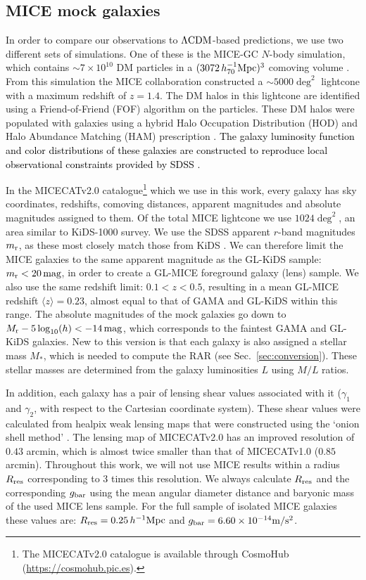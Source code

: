 \documentclass[usenatbib]{mnras}
\newcommand{\hMpc}{\, h^{-1}{\rm{Mpc}} }
\newcommand{\magn}{\, {\rm mag} }
\newcommand{\mpss}{ {\rm m/s^2} }
\newcommand{\hsMpc}{\, h_{70}^{-1}{\rm{Mpc}} }
\newcommand{\lcdm}{{\rm \Lambda CDM}}
\newcommand*{\meanb}[1]{\langle{#1}\rangle}
\newcommand*{\E}[1]{\times 10^{#1}}
\newcommand{\un}[1]{_{\rm #1}}
\begin{document}
\subsection{MICE mock galaxies}
\label{sec:mice_mocks}

In order to compare our observations to $\lcdm$-based predictions, we use two different sets of simulations. One of these is the MICE-GC $N$-body simulation, which contains $\sim 7\E{10}$ DM particles in a $(3072 \hsMpc)^3$ comoving volume \cite[]{fosalba2015b}. From this simulation the MICE collaboration constructed a $\sim5000\deg^2$ lightcone with a maximum redshift of $z=1.4$. The DM halos in this lightcone are identified using a Friend-of-Friend (FOF) algorithm on the particles. These DM halos were populated with galaxies using a hybrid Halo Occupation Distribution (HOD) and Halo Abundance Matching (HAM) prescription \cite[]{carretero2015,crocce2015}. \textcolor{black}{The galaxy luminosity function and color distributions of these galaxies are constructed to reproduce local observational constraints provided by SDSS \cite[]{blanton2003a, blanton2003b, blanton2005}.}

In the MICECATv2.0 catalogue\footnote{The MICECATv2.0 catalogue is available through CosmoHub (\url{https://cosmohub.pic.es}).} which we use in this work, every galaxy has sky coordinates, redshifts, comoving distances, apparent magnitudes and absolute magnitudes assigned to them. Of the total MICE lightcone we use $1024\deg^2$, an area similar to KiDS-1000 survey. We use the SDSS apparent $r$-band magnitudes $m\un{r}$, as these most closely match those from KiDS \cite[see][]{brouwer2018}. We can therefore limit the MICE galaxies to the same apparent magnitude as the GL-KiDS sample: $m\un{r}<20 \, {\rm mag}$, in order to create a GL-MICE foreground galaxy (lens) sample. We also use the same redshift limit: $0.1<z<0.5$, resulting in a mean GL-MICE redshift $\meanb{z}=0.23$, almost equal to that of GAMA and GL-KiDS within this range. The absolute magnitudes of the mock galaxies go down to $M\un{r} - 5\log_{10}(h) < -14 \magn$, which corresponds to the faintest GAMA and GL-KiDS galaxies. New to this version is that each galaxy is also assigned a stellar mass $M_*$, which is needed to compute the RAR (see Sec.~\ref{sec:conversion}). These stellar masses are determined from the galaxy luminosities $L$ using \cite{bell2001} $M/L$ ratios.

In addition, each galaxy has a pair of lensing shear values associated with it ($\gamma_1$ and $\gamma_2$, with respect to the Cartesian coordinate system). These shear values were calculated from healpix weak lensing maps that were constructed using the `onion shell method' \cite[]{fosalba2008, fosalba2015a}. The lensing map of MICECATv2.0 has an improved resolution of $0.43$ arcmin, which is almost twice smaller than that of MICECATv1.0 ($0.85$ arcmin). Throughout this work, we will not use MICE results within a radius $R\un{res}$ corresponding to 3 times this resolution. We always calculate $R\un{res}$ and the corresponding $g\un{bar}$ using the mean angular diameter distance and baryonic mass of the used MICE lens sample. For the full sample of isolated MICE galaxies these values are: $R\un{res}=0.25 \hMpc$ and $g\un{bar}=6.60\E{-14} \mpss$.
\end{document}
